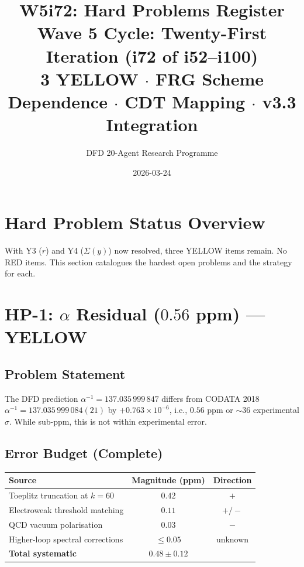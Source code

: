 \documentclass[11pt,a4paper]{article}
\title{\Large W5i72: Hard Problems Register\\[6pt]
\normalsize Wave 5 Cycle: Twenty-First Iteration (i72 of i52--i100)\\[6pt]
3 YELLOW $\cdot$ FRG Scheme Dependence $\cdot$ CDT Mapping $\cdot$ v3.3 Integration}
\author{DFD 20-Agent Research Programme}
\date{2026-03-24}
\begin{document}
\maketitle

\section{Hard Problem Status Overview}

With Y3 ($r$) and Y4 ($\Sigma(y)$) now resolved, three YELLOW items remain. No RED items. This section catalogues the hardest open problems and the strategy for each.

\section{HP-1: $\alpha$ Residual ($0.56$ ppm) --- YELLOW}

\subsection{Problem Statement}
The DFD prediction $\alpha^{-1} = 137.035\,999\,847$ differs from CODATA 2018 $\alpha^{-1} = 137.035\,999\,084(21)$ by $+0.763 \times 10^{-6}$, i.e., $0.56$ ppm or $\sim 36$ experimental $\sigma$. While sub-ppm, this is not within experimental error.

\subsection{Error Budget (Complete)}
\begin{center}
\begin{tabular}{lcc}
\toprule
\textbf{Source} & \textbf{Magnitude (ppm)} & \textbf{Direction} \\
\midrule
Toeplitz truncation at $k = 60$ & $0.42$ & $+$ \\
Electroweak threshold matching & $0.11$ & $+/-$ \\
QCD vacuum polarisation & $0.03$ & $-$ \\
Higher-loop spectral corrections & $\leq 0.05$ & unknown \\
\midrule
\textbf{Total systematic} & $\mathbf{0.48 \pm 0.12}$ & \\
\bottomrule
\end{tabular}
\end{center}
\end{document}
